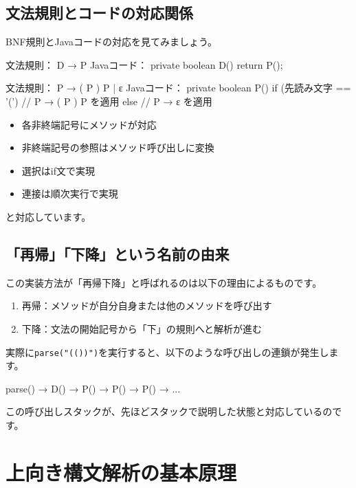 \subsection{文法規則とコードの対応関係}

BNF規則とJavaコードの対応を見てみましょう。

\begin{codescreen}{}
文法規則： D → P
Javaコード： private boolean D() { return P(); }

文法規則： P → ( P ) P | ε
Javaコード： private boolean P() {
    if (先読み文字 == '(') {
        // P → ( P ) P を適用
    } else {
        // P → ε を適用
    }
}
\end{codescreen}

\begin{itemize}
\item
  各非終端記号にメソッドが対応
\item
  非終端記号の参照はメソッド呼び出しに変換
\item
  選択はif文で実現
\item
  連接は順次実行で実現
\end{itemize}

\noindent と対応しています。

\subsection{「再帰」「下降」という名前の由来}

この実装方法が「再帰下降」と呼ばれるのは以下の理由によるものです。

\begin{enumerate}
\item
  再帰：メソッドが自分自身または他のメソッドを呼び出す
\item
  下降：文法の開始記号から「下」の規則へと解析が進む
\end{enumerate}

実際に\texttt{parse("(())")}を実行すると、以下のような呼び出しの連鎖が発生します。

\begin{codescreen}{}
parse() → D() → P() → P() → P() → ...
\end{codescreen}

この呼び出しスタックが、先ほどスタックで説明した状態と対応しているのです。

\section{上向き構文解析の基本原理}

